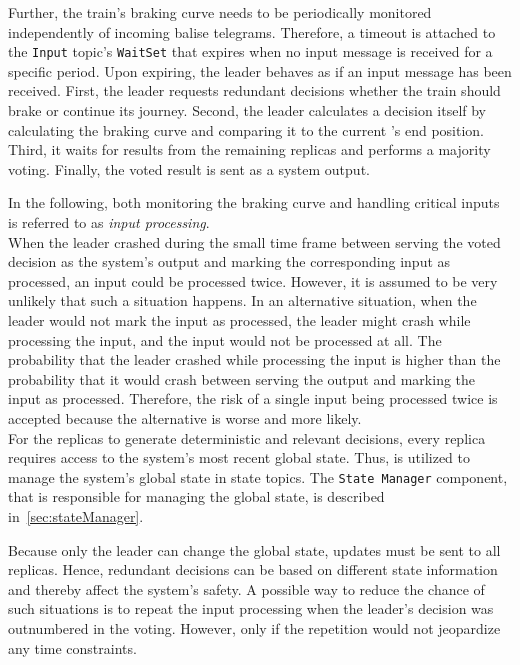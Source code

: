 \noindent
Further, the train's braking curve needs to be periodically monitored independently of incoming balise telegrams.
Therefore, a timeout is attached to the \texttt{Input} topic's \texttt{WaitSet} that expires when no input message is received for a specific period.
Upon expiring, the leader behaves as if an input message has been received.
First, the leader requests redundant decisions whether the train should brake or continue its journey.
Second, the leader calculates a decision itself by calculating the braking curve and comparing it to the current 's end position.
Third, it waits for results from the remaining replicas and performs a majority voting.
Finally, the voted result is sent as a system output.

In the following, both monitoring the braking curve and handling critical inputs is referred to as \textit{input processing}.
\\

\noindent
When the leader crashed during the small time frame between serving the voted decision as the system's output and marking the corresponding input as processed, an input could be processed twice.
However, it is assumed to be very unlikely that such a situation happens.
In an alternative situation, when the leader would not mark the input as processed, the leader might crash while processing the input, and the input would not be processed at all.
The probability that the leader crashed while processing the input is higher than the probability that it would crash between serving the output and marking the input as processed.
Therefore, the risk of a single input being processed twice is accepted because the alternative is worse and more likely.
\\

\noindent
For the replicas to generate deterministic and relevant decisions, every replica requires access to the system's most recent global state.
Thus,  is utilized to manage the system's global state in state topics.
The \texttt{State Manager} component, that is responsible for managing the global state, is described in~\autoref{sec:stateManager}.

Because only the leader can change the global state, updates must be sent to all replicas.
Hence, redundant decisions can be based on different state information and thereby affect the system's safety.
A possible way to reduce the chance of such situations is to repeat the input processing when the leader's decision was outnumbered in the voting.
However, only if the repetition would not jeopardize any time constraints.

